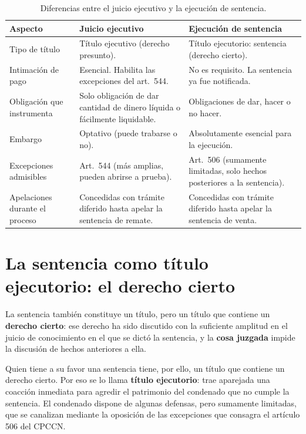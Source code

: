 \documentclass[12pt,oneside]{book}
\begin{document}
\begin{table}[H]
\centering
\small
\begin{tabularx}{\textwidth}{
    >{\raggedright\arraybackslash}p{}
    >{\raggedright\arraybackslash}X
    >{\raggedright\arraybackslash}X
}
\toprule
\textbf{Aspecto} & \textbf{Juicio ejecutivo} & \textbf{Ejecución de sentencia} \\
\midrule
Tipo de título &
Título ejecutivo (derecho presunto). &
Título ejecutorio: sentencia (derecho cierto). \\[0.3em]

Intimación de pago &
Esencial. Habilita las excepciones del art.~544. &
No es requisito. La sentencia ya fue notificada. \\[0.3em]

Obligación que instrumenta &
Solo obligación de dar cantidad de dinero líquida o fácilmente liquidable. &
Obligaciones de dar, hacer o no hacer. \\[0.3em]

Embargo &
Optativo (puede trabarse o no). &
Absolutamente esencial para la ejecución. \\[0.3em]

Excepciones admisibles &
Art.~544 (más amplias, pueden abrirse a prueba). &
Art.~506 (sumamente limitadas, solo hechos posteriores a la sentencia). \\[0.3em]

Apelaciones durante el proceso &
Concedidas con trámite diferido hasta apelar la sentencia de remate. &
Concedidas con trámite diferido hasta apelar la sentencia de venta. \\
\bottomrule
\end{tabularx}
\caption{Diferencias entre el juicio ejecutivo y la ejecución de sentencia.}
\end{table}

\section{La sentencia como título ejecutorio: el derecho cierto}

La sentencia también constituye un título, pero un título que contiene un \textbf{derecho cierto}: ese derecho ha sido discutido con la suficiente amplitud en el juicio de conocimiento en el que se dictó la sentencia, y la \textbf{cosa juzgada} impide la discusión de hechos anteriores a ella.

Quien tiene a su favor una sentencia tiene, por ello, un título que contiene un derecho cierto. Por eso se lo llama \textbf{título ejecutorio}: trae aparejada una coacción inmediata para agredir el patrimonio del condenado que no cumple la sentencia. El condenado dispone de algunas defensas, pero sumamente limitadas, que se canalizan mediante la oposición de las excepciones que consagra el artículo 506 del CPCCN.
\end{document}
